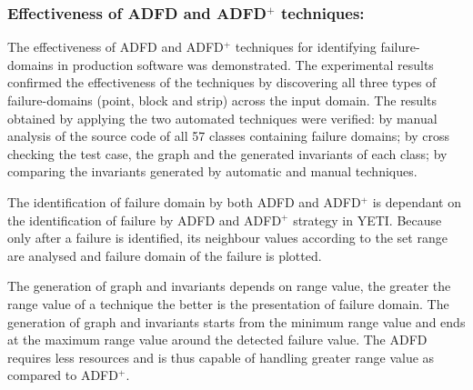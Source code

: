 






\subsubsection{Effectiveness of ADFD and ADFD$^+$ techniques:}
The effectiveness of ADFD and ADFD$^+$ techniques for identifying failure-domains in production software was demonstrated. The experimental results confirmed the effectiveness of the techniques by discovering all three types of failure-domains (point, block and strip) across the input domain. The results obtained by applying the two automated techniques were verified: by manual analysis of the source code of all 57 classes containing failure domains; by cross checking the test case, the graph and the generated invariants of each class; by comparing the invariants generated by automatic and manual techniques. 

The identification of failure domain by both ADFD and ADFD$^+$ is dependant on the identification of failure by ADFD and ADFD$^+$ strategy in YETI. Because only after a failure is identified, its neighbour values according to the set range are analysed and failure domain of the failure is plotted.

The generation of graph and invariants depends on range value, the greater the range value of a technique the better is the presentation of failure domain. The generation of graph and invariants starts from the minimum range value and ends at the maximum range value around the detected failure value. The ADFD requires less resources and is thus capable of handling  greater range value as compared to ADFD$^+$.  




